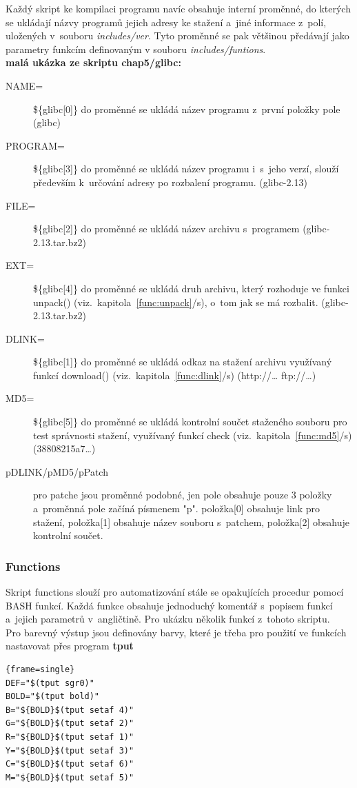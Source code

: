 \documentclass[a4paper,12pt]{article}
\newcommand{\odkazNaKapitolu}[1]{(viz.~kapitola~\ref{#1}/s\pageref{#1})}
\renewcommand{\b}[1]{\textbf{#1}} %
\newenvironment{codeframe}{%
  \begin{Sbox} 
    \begin{minipage} 
      {\columnwidth-\leftmargin-\rightmargin-2\fboxsep-2\fboxrule-4pt} 
}{%

  \end{minipage} 
  \end{Sbox} 
  \begin{center} 
    \fcolorbox{black}{codeback}{\TheSbox} 
  \end{center} 
}
\begin{document}
Každý skript ke kompilaci programu navíc obsahuje interní proměnné, do kterých se ukládají názvy programů jejich adresy ke stažení a~jiné informace z~polí, uložených v~souboru \textit{includes/ver}. Tyto proměnné se pak většinou předávají jako parametry funkcím definovaným v souboru \textit{includes/funtions}.\\

\b{malá ukázka ze skriptu chap5/glibc:}
\begin{description}
 \item[NAME=]\$\{glibc[0]\} do proměnné se ukládá název programu z~první položky pole (glibc)
 \item[PROGRAM=]\$\{glibc[3]\} do proměnné se ukládá název programu i~s~jeho verzí, slouží především k~určování adresy po rozbalení programu. (glibc-2.13)
 \item[FILE=]\$\{glibc[2]\} do proměnné se ukládá název archivu s~programem (glibc-2.13.tar.bz2)
 \item[EXT=]\$\{glibc[4]\} do proměnné se ukládá druh archivu, který rozhoduje ve funkci unpack() \odkazNaKapitolu{func:unpack}, o~tom jak se má rozbalit. (glibc-2.13.tar.bz2)
 \item[DLINK=]\$\{glibc[1]\} do proměnné se ukládá odkaz na stažení archivu využívaný funkcí download() \odkazNaKapitolu{func:dlink} (http://… ftp://…)
 \item[MD5=]\$\{glibc[5]\} do proměnné se ukládá kontrolní součet staženého souboru pro test správnosti stažení, využívaný funkcí check \odkazNaKapitolu{func:md5} (38808215a7…)
 \item[pDLINK/pMD5/pPatch] pro patche jsou proměnné podobné, jen pole obsahuje pouze 3 položky a~proměnná pole začíná písmenem "p". položka[0] obsahuje link pro stažení, položka[1] obsahuje název souboru s~patchem, položka[2] obsahuje kontrolní součet.
 \end{description}

\subsubsection{Functions}
Skript functions slouží pro automatizování stále se opakujících procedur pomocí BASH funkcí. Každá funkce obsahuje jednoduchý komentář s~popisem funkcí a~jejich parametrů v~angličtině. Pro ukázku několik funkcí z~tohoto skriptu.\\

Pro barevný výstup jsou definovány barvy, které je třeba pro použití ve funkcích nastavovat přes program \b{tput}
    \begin{codeframe} 
\begin{Verbatim}{frame=single} 
DEF="$(tput sgr0)"
BOLD="$(tput bold)"
B="${BOLD}$(tput setaf 4)"
G="${BOLD}$(tput setaf 2)"
R="${BOLD}$(tput setaf 1)"
Y="${BOLD}$(tput setaf 3)"
C="${BOLD}$(tput setaf 6)"
M="${BOLD}$(tput setaf 5)"
\end{Verbatim} 
    \end{codeframe}
\end{document}
